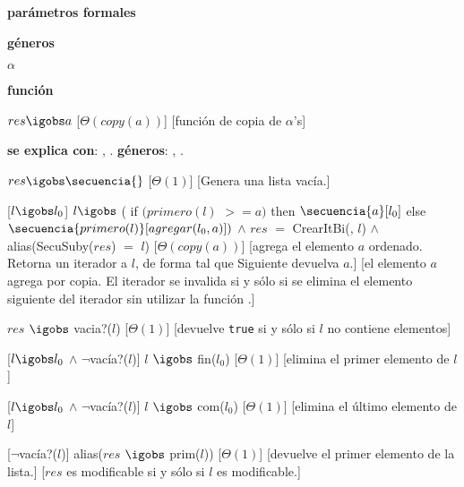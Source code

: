 \begin{Interfaz}
  
  \textbf{parámetros formales}\parindent\\
  \parbox{1.7cm}{\textbf{géneros}} $\alpha$\\
  \parbox[t]{1.7cm}{\textbf{función}}\parbox[t]{\textwidth-2\parindent-1.7cm}{%
    {$res \igobs a$}
    [$\Theta(copy(a))$]
    [función de copia de $\alpha$'s]
  }

  \textbf{se explica con}: , .
  \textbf{géneros}: , .

  {$res \igobs \secuencia{}$}%
  [$\Theta(1)$]
  [Genera una lista vacía.]

  [$l \igobs l_{0}$]
  {$l \igobs$ ( if  $(primero(l)$ $>= a)$  then $\secuencia{a}[l_{0}]$ else $\secuencia{primero(l)}[agregar(l_{0},a)])$ $\land$ $res$ $=$ CrearItBi(\secuencia{}, $l$) $\land$ alias(SecuSuby($res$) $=$ $l$)}
  [$\Theta(copy(a))$]
  [agrega el elemento $a$ ordenado.  Retorna un iterador a $l$, de forma tal que Siguiente devuelva $a$.]
  [el elemento $a$ agrega por copia. El iterador se invalida si y sólo si se elimina el elemento siguiente del iterador sin utilizar la función .]

  {$res$ $\igobs$ vacia?($l$)}
  [$\Theta(1)$]
  [devuelve \texttt{true} si y sólo si $l$ no contiene elementos]

  [$l \igobs l_0$ $\land$ $\lnot$vacía?($l$)]
  {$l$ $\igobs$ fin($l_0$)}
  [$\Theta(1)$]
  [elimina el primer elemento de $l$]

  [$l \igobs l_0$ $\land$ $\lnot$vacía?($l$)]
  {$l$ $\igobs$ com($l_0$)}
  [$\Theta(1)$]
  [elimina el último elemento de $l$]

  [$\lnot$vacía?($l$)]
  {alias($res$ $\igobs$ prim($l$))}
  [$\Theta(1)$]
  [devuelve el primer elemento de la lista.]
  [$res$ es modificable si y sólo si $l$ es modificable.]


\end{Interfaz}
